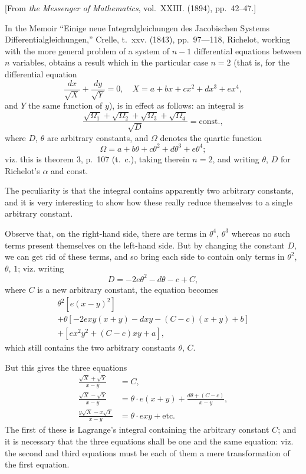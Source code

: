 \documentclass[11pt,a4paper]{book}
\begin{document}
{{{[From \textit{the Messenger of Mathematics}, vol.~XXIII. (1894), pp.~42--47.]
\bigskip

In the Memoir ``Einige neue Integralgleichungen des Jacobischen Systems Differentialgleichungen,'' Crelle, t.~xxv. (1843), pp.~97---118, Richelot, working with the more general problem of a system of $n-1$ differential equations between $n$ variables, obtains a result which in the particular case $n=2$ (that is, for the differential equation
\[
\frac{dx}{\sqrt{X}} + \frac{dy}{\sqrt{Y}} = 0, \quad X = a + bx + cx^2 + dx^3 + ex^4,
\]
and $Y$ the same function of $y$), is in effect as follows: an integral is
\[
\frac{\sqrt{\Omega_1}+\sqrt{\Omega_2}+\sqrt{\Omega_3}+\sqrt{\Omega_4}}{\sqrt{D}} = \text{const.},
\]
where $D$, $\theta$ are arbitrary constants, and $\Omega$ denotes the quartic function
\[
\Omega = a + b\theta + c\theta^2 + d\theta^3 + e\theta^4;
\]
viz. this is theorem 3, p.~107 (t.~c.), taking therein $n=2$, and writing $\theta$, $D$ for Richelot's $\alpha$ and const.

The peculiarity is that the integral contains apparently two arbitrary constants, and it is very interesting to show how these really reduce themselves to a single arbitrary constant.

Observe that, on the right-hand side, there are terms in $\theta^4$, $\theta^3$ whereas no such terms present themselves on the left-hand side. But by changing the constant $D$, we can get rid of these terms, and so bring each side to contain only terms in $\theta^2$, $\theta$, $1$; viz. writing
\[
D = -2e\theta^2 - d\theta - c + C,
\]
where $C$ is a new arbitrary constant, the equation becomes
\begin{multline*}
\theta^2\left[e(x-y)^2\right] \\
+ \theta\left[-2exy(x+y) - dxy - (C-c)(x+y) + b\right] \\
+ \left[ex^2y^2 + (C-c)xy + a\right],
\end{multline*}
which still contains the two arbitrary constants $\theta$, $C$.

But this gives the three equations
\begin{align*}
\frac{\sqrt{X}+\sqrt{Y}}{x-y} &= C, \\
\frac{\sqrt{X}-\sqrt{Y}}{x-y} &= \theta\cdot e(x+y) + \frac{d\theta + (C-c)}{x-y}, \\
\frac{y\sqrt{X}-x\sqrt{Y}}{x-y} &= \theta\cdot exy + \text{etc.}
\end{align*}
The first of these is Lagrange's integral containing the arbitrary constant $C$; and it is necessary that the three equations shall be one and the same equation: viz. the second and third equations must be each of them a mere transformation of the first equation.

}}}
\end{document}
